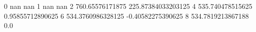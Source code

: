 0 nan nan
1 nan nan
2 760.65576171875 225.87384033203125
4 535.740478515625 0.95855712890625
6 534.3760986328125 -0.40582275390625
8 534.7819213867188 0.0
